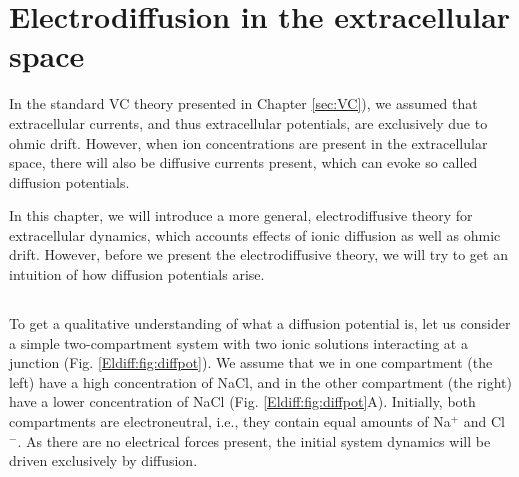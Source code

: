 \section{Electrodiffusion in the extracellular space}
\label{sec:Eldiff}
In the standard VC theory presented in Chapter \ref{sec:VC}), we assumed that extracellular currents, and thus extracellular potentials, are exclusively due to ohmic drift. However, when ion concentrations are present in the extracellular space, there will also be diffusive currents present, which can evoke so called diffusion potentials. 

In this chapter, we will introduce a more general, electrodiffusive theory for extracellular dynamics, which accounts effects of ionic diffusion as well as ohmic drift. However, before we present the electrodiffusive theory, we will try to get an intuition of how diffusion potentials arise.

\subsection{}
To get a qualitative understanding of what a diffusion potential is, let us consider a simple two-compartment system with two ionic solutions interacting at a junction  (Fig. \ref{Eldiff:fig:diffpot}). We assume that we in one compartment (the left) have a high concentration of NaCl, and in the other compartment (the right) have a lower concentration of NaCl (Fig. \ref{Eldiff:fig:diffpot}A). Initially, both compartments are electroneutral, i.e., they contain equal amounts of Na$^+$ and Cl$^-$. As there are no electrical forces present, the initial system dynamics will be driven exclusively by diffusion. 

